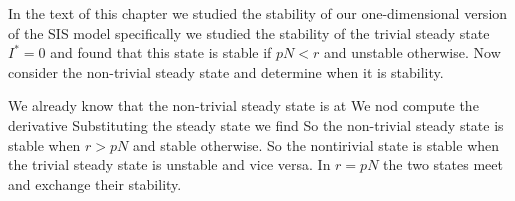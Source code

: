 

In the text of this chapter we studied the stability of our one-dimensional version of the SIS model
specifically we studied the stability of the trivial steady state $I^*=0$ and found that this state is stable if $pN<r$ and unstable otherwise. Now consider the non-trivial steady state and determine when it is stability.

\solution 
We already know that the non-trivial steady state is at 
We nod compute the derivative 
Substituting the steady state we find 
So the non-trivial steady state is stable when $r>pN$ and stable otherwise. So the nontirivial state is stable when the trivial steady state is unstable and vice versa. In $r=pN$ the two states meet and exchange their stability. 
